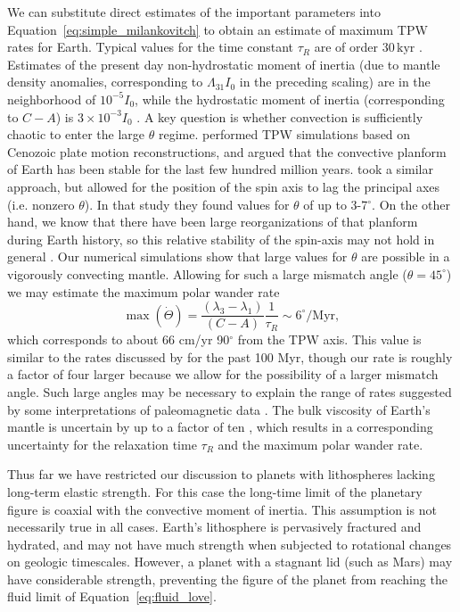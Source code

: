 \documentclass[preprint,12pt,authoryear]{elsarticle}
\begin{document}
We can substitute direct estimates of the important parameters into Equation~\eqref{eq:simple_milankovitch} to obtain an estimate of maximum TPW rates for Earth.
Typical values for the time constant $\tau_R$ are of order $30 \, \mathrm{kyr}$ \citep{ricard1993polar}.
Estimates of the present day non-hydrostatic moment of inertia (due to mantle density anomalies, corresponding to $\Lambda_{31}I_0$ in the preceding scaling)
are in the neighborhood of $10^{-5} I_0$, while the hydrostatic moment of inertia (corresponding to $C-A$) is $3 \times 10^{-3} I_0$ \citep{chambat2001mean}.
A key question is whether convection is sufficiently chaotic to enter the large $\theta$ regime. 
\citet{richards1997explanation} performed TPW simulations based on Cenozoic plate motion reconstructions, and argued that the convective planform of Earth has been stable for the last few hundred million years. 
\citet{cambiotti2011new} took a similar approach, but allowed for the position of the spin axis to lag the principal axes (i.e. nonzero $\theta$). In that study they found values for $\theta$ of up to 3-7$^\circ$.
On the other hand, we know that there have been large reorganizations of that planform during Earth history,
so this relative stability of the spin-axis may not hold in general \citep{evans2003true}.
Our numerical simulations show that large values for $\theta$ are possible in a vigorously convecting mantle.
Allowing for such a large mismatch angle ($\theta = 45^\circ$) we may estimate the maximum polar wander rate
\begin{equation}
\max ( \dot{\Theta} ) = \frac{(\lambda_3-\lambda_1)}{(C-A)}\frac{1}{\tau_R} \sim 6^\circ / \mathrm{Myr},
\end{equation}
which corresponds to about 66 cm/yr 90$^\circ$ from the TPW axis.
This value is similar to the rates discussed by \citet{cambiotti2011new} for the past 100 Myr, though our rate is roughly a factor of four larger because we allow for the
possibility of a larger mismatch angle. Such large angles may be necessary to explain the range of rates suggested by some interpretations of paleomagnetic data \citep{mitchell2011sutton}.
The bulk viscosity of Earth's mantle is uncertain by up to a factor of ten \citep{mitrovica2004new},
which results in a corresponding uncertainty for the relaxation time $\tau_R$ and the maximum polar wander rate.

Thus far we have restricted our discussion to planets with lithospheres lacking long-term elastic strength.
For this case the long-time limit of the planetary figure is coaxial with the convective 
moment of inertia. This assumption is not necessarily true in all cases.
Earth's lithosphere is pervasively fractured and hydrated, and may not have much strength when subjected to rotational changes on geologic timescales.
However, a planet with a stagnant lid (such as Mars) may have considerable strength, preventing the figure of the planet 
from reaching the fluid limit of Equation~\eqref{eq:fluid_love}.
\end{document}
